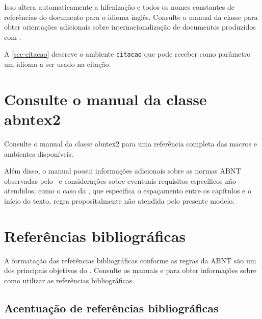 \documentclass[12pt,oneside,a4paper,chapter=TITLE,
			   english,brazil]{abntex2}
\begin{document}
\begin{anexosenv}
Isso altera automaticamente a hifenização e todos os nomes constantes de referências do documento para o idioma inglês. Consulte o manual da classe \cite{abntex2classe} para obter orientações adicionais sobre internacionalização de documentos produzidos com \abnTeX.

A \autoref{sec-citacao} descreve o ambiente \texttt{citacao} que pode receber como parâmetro um idioma a ser usado na citação.

\section{Consulte o manual da classe \textsf{abntex2}}

Consulte o manual da classe \textsf{abntex2} \cite{abntex2classe} para uma referência completa das macros e ambientes disponíveis. 

Além disso, o manual possui informações adicionais sobre as normas ABNT observadas pelo \abnTeX\ e considerações sobre eventuais requisitos específicos não atendidos, como o caso da , que especifica o espaçamento entre os capítulos e o início do texto, regra propositalmente não atendida pelo presente modelo.

\section{Referências bibliográficas}

A formatação das referências bibliográficas conforme as regras da ABNT são um dos principais objetivos do \abnTeX. Consulte os manuais  e  para obter informações sobre como utilizar as referências bibliográficas.

\subsection{Acentuação de referências bibliográficas}


\end{anexosenv}
\end{document}
